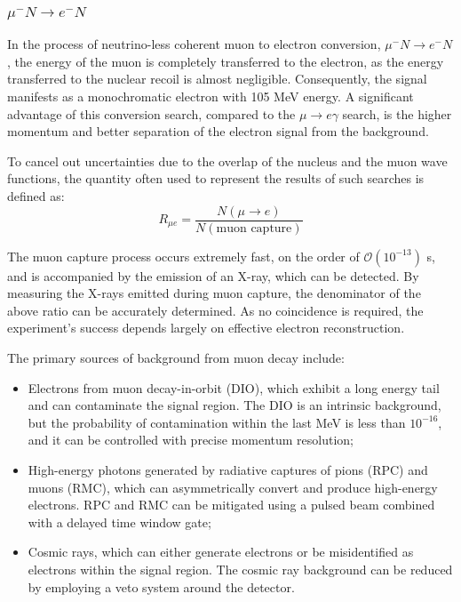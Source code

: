 \subsubsection{$\mu^- N \rightarrow e^- N $}
In the process of neutrino-less coherent muon to electron conversion, 
$\mu^- N \rightarrow e^- N$, the energy of the muon is completely 
transferred to the electron, as the energy transferred to the nuclear 
recoil is almost negligible. Consequently, the signal manifests 
as a monochromatic electron with 105 MeV energy. A significant 
advantage of this conversion search, compared to the 
$\mu \rightarrow e \gamma$ search, is the higher momentum 
and better separation of the electron signal from the background.

To cancel out uncertainties due to the overlap of the 
nucleus and the muon wave functions, the quantity often 
used to represent the results of such searches is defined as: 
\begin{equation} 
  R_{\mu e} = \frac{N(\mu \rightarrow e)}{N(\text{muon capture})} 
\end{equation} 

The muon capture process occurs extremely fast, 
on the order of $\mathcal{O}(10^{-13})$ s, and is 
accompanied by the emission of an X-ray, which can be detected. 
By measuring the X-rays emitted during muon capture, the denominator of 
the above ratio can be accurately determined. As no coincidence 
is required, the experiment's success depends largely on effective electron reconstruction.

The primary sources of background from muon decay include: 
\begin{itemize} 
  \item Electrons from muon decay-in-orbit (DIO), which exhibit a 
  long energy tail and can contaminate the signal region. 
  The DIO is an intrinsic background, but the probability of 
  contamination within the last MeV is less than $10^{-16}$, 
  and it can be controlled with precise momentum resolution; 
  \item High-energy photons generated by radiative captures of pions (RPC) 
  and muons (RMC), which can asymmetrically convert and produce high-energy 
  electrons. RPC and RMC can be mitigated using a pulsed beam combined with a delayed 
  time window gate; 
  \item Cosmic rays, which can either generate electrons or be misidentified as 
  electrons within the signal region. The cosmic ray background can be reduced 
  by employing a veto system around the detector. 
\end{itemize}

